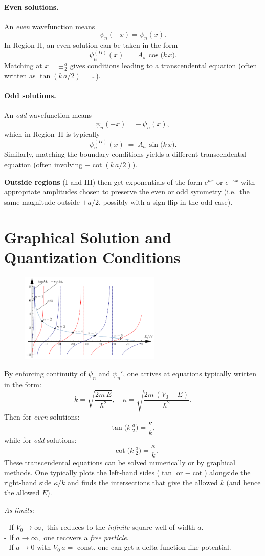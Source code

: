 \paragraph{Even solutions.} 
An \emph{even} wavefunction means
\[
\psi_n(-x) = \psi_n(x).
\]
In Region II, an even solution can be taken in the form
\[
\psi_n^{(II)}(x) \;=\; A_s\,\cos\bigl(k\,x\bigr).
\]
Matching at $x=\pm\tfrac{a}{2}$ gives conditions leading to a transcendental equation (often written as $\tan(k\,a/2)$ = \dots).

\paragraph{Odd solutions.}
An \emph{odd} wavefunction means
\[
\psi_n(-x) = -\,\psi_n(x),
\]
which in Region~II is typically
\[
\psi_n^{(II)}(x) \;=\; A_a\,\sin\bigl(k\,x\bigr).
\]
Similarly, matching the boundary conditions yields a different transcendental equation (often involving $-\cot(k\,a/2)$).

\medskip
\noindent
\textbf{Outside regions} (I and III) then get exponentials of the form $e^{\kappa x}$ or $e^{-\kappa x}$ with appropriate amplitudes chosen to preserve the even or odd symmetry (i.e.\ the same magnitude outside $\pm a/2$, possibly with a sign flip in the odd case).

\section*{Graphical Solution and Quantization Conditions}
\begin{figure}[H]
    \centering
    \includegraphics[width=0.6\textwidth]{Figures/06.png}
    \caption{}
    \label{fig:}
\end{figure}
By enforcing continuity of $\psi_n$ and $\psi_n'$, one arrives at equations typically written in the form:
\[
k = \sqrt{\frac{2m\,E}{\hbar^2}}, 
\quad
\kappa = \sqrt{\frac{2m\,(V_0 - E)}{\hbar^2}}.
\]
Then for \emph{even} solutions:
\[
\tan\!\bigl(k\,\tfrac{a}{2}\bigr) 
= 
\frac{\kappa}{k}, 
\]
while for \emph{odd} solutions:
\[
-\cot\!\bigl(k\,\tfrac{a}{2}\bigr) 
= 
\frac{\kappa}{k}.
\]
These transcendental equations can be solved numerically or by graphical methods.  One typically plots the left‐hand sides ($\tan$ or $-\cot$) alongside the right‐hand side $\kappa/k$ and finds the intersections that give the allowed $k$ (and hence the allowed $E$).

\bigskip
\begin{center}
\textit{As limits:} 

- If $V_0 \to \infty,$ this reduces to the \emph{infinite} square well of width $a$.\\
- If $a \to \infty,$ one recovers a \emph{free particle}.\\
- If $a \to 0$ with $V_0\,a =$ const, one can get a delta‐function‐like potential. 
\end{center}